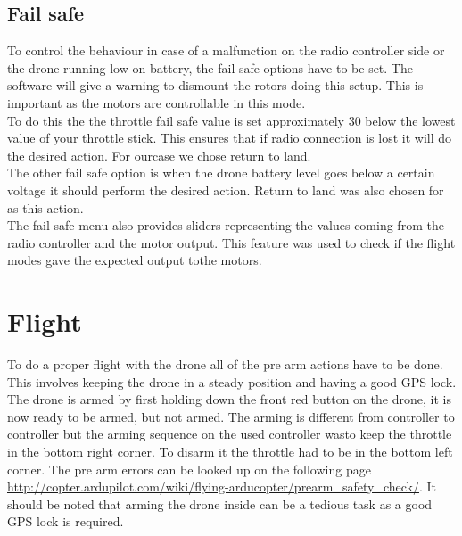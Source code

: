 \subsection*{Fail safe}
To control the behaviour in case of a malfunction on the radio controller side or the drone running
low on battery, the fail safe options have to be set. The software will give a warning to dismount
the rotors doing this setup. This is important as the motors are controllable in this mode.\\
To do this the the throttle fail safe value is set approximately 30 below the lowest value of your
throttle stick. This ensures that if radio connection is lost it will do the desired action. For
ourcase we chose return to land.\\
The other fail safe option is when the drone battery level goes below a certain voltage it should
perform the desired action. Return to land was also chosen for as this action.\\
The fail safe menu also provides sliders representing the values coming from the radio controller
and the motor output. This feature was used to check if the flight modes gave the expected output
tothe motors.

\section{Flight}
To do a proper flight with the drone all of the pre arm actions have to be done. This involves
keeping the drone in a steady position and having a good GPS lock. The drone is armed by first
holding down the front red button on the drone, it is now ready to be armed, but not armed. The
arming is different from controller to controller but the arming sequence on the used controller
wasto keep the throttle in the bottom right corner. To disarm it the throttle had to be in the
bottom
left corner. The pre arm errors can be looked up on the following page
\url{http://copter.ardupilot.com/wiki/flying-arducopter/prearm_safety_check/}. It should be noted
that arming the drone inside can be a tedious task as a good GPS lock is required.\\

